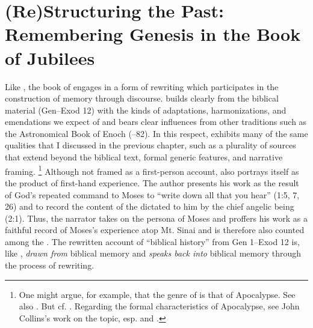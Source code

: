 
\nocite{dillamnn_jbw_kleine}
\nocite{ewald_zkm1844}

\chapter{(Re)Structuring the Past: Remembering Genesis in the Book of Jubilees}
\label{chap:jubilees}

Like \ga, the book of \jub engages in a form of rewriting which participates in the construction of memory through \psgraphical discourse. \jub builds clearly from the biblical material (Gen--Exod 12) with the kinds of adaptations, harmonizations, and emendations we expect of \rwb and bears clear influences from other \secondtemple traditions such as the Astronomical Book of Enoch (--82). In this respect, \jub exhibits many of the same qualities that I discussed in the previous chapter, such as a plurality of sources that extend beyond the biblical text, formal generic features, and narrative framing.%
    \footnote{%
        One might argue, for example, that the genre of \jub is that  of Apocalypse. See also 
        \cite{kugel_dsd1994}. But cf. 
        \cite{hanneken2012}. Regarding the formal characteristics of Apocalypse, see John Collins's work on the topic, esp. 
        \cite{collins_mason-etal2012} and 
        \cite{collins_semeia1979}.}
Although not framed as a first-person account, \jub also portrays itself as the product of first-hand experience. The author presents his work as the result of God's repeated command to Moses to ``write down all that you hear'' (1:5, 7, 26) and to record the content of the \heavenlytablets dictated to him by the chief angelic being (2:1). Thus, the narrator takes on the persona of Moses and proffers his work as a faithful record of Moses's experience atop Mt. Sinai and is therefore also counted among the \psa. The rewritten account of ``biblical history'' from Gen 1--Exod 12 is, like \ga, \emph{drawn from} biblical memory and \emph{speaks back into} biblical memory through the process of rewriting. 

